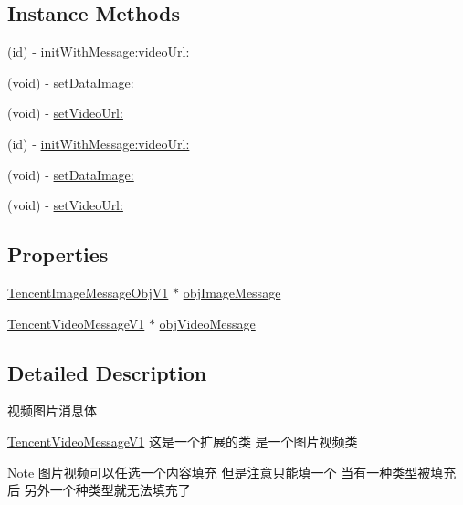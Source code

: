 \subsection*{Instance Methods}
\begin{DoxyCompactItemize}
\item 
(id) -\/ \mbox{\hyperlink{interface_tencent_image_and_video_message_obj_v1_a7726190ba2e9115e6da8926579156b97}{init\+With\+Message\+:video\+Url\+:}}
\item 
(void) -\/ \mbox{\hyperlink{interface_tencent_image_and_video_message_obj_v1_a20ea61f616fbd28176b83cfd0a2dfb78}{set\+Data\+Image\+:}}
\item 
(void) -\/ \mbox{\hyperlink{interface_tencent_image_and_video_message_obj_v1_ae5621c0fa27f66e338e8537d403aeeaa}{set\+Video\+Url\+:}}
\item 
(id) -\/ \mbox{\hyperlink{interface_tencent_image_and_video_message_obj_v1_a7726190ba2e9115e6da8926579156b97}{init\+With\+Message\+:video\+Url\+:}}
\item 
(void) -\/ \mbox{\hyperlink{interface_tencent_image_and_video_message_obj_v1_a20ea61f616fbd28176b83cfd0a2dfb78}{set\+Data\+Image\+:}}
\item 
(void) -\/ \mbox{\hyperlink{interface_tencent_image_and_video_message_obj_v1_ae5621c0fa27f66e338e8537d403aeeaa}{set\+Video\+Url\+:}}
\end{DoxyCompactItemize}
\subsection*{Properties}
\begin{DoxyCompactItemize}
\item 
\mbox{\hyperlink{interface_tencent_image_message_obj_v1}{Tencent\+Image\+Message\+Obj\+V1}} $\ast$ \mbox{\hyperlink{interface_tencent_image_and_video_message_obj_v1_a3fed6a96ac0a27bfbdf810b12e654d3e}{obj\+Image\+Message}}
\item 
\mbox{\hyperlink{interface_tencent_video_message_v1}{Tencent\+Video\+Message\+V1}} $\ast$ \mbox{\hyperlink{interface_tencent_image_and_video_message_obj_v1_a26cdc5a89d5f227771782ee04679afea}{obj\+Video\+Message}}
\end{DoxyCompactItemize}


\subsection{Detailed Description}
视频图片消息体 

\mbox{\hyperlink{interface_tencent_video_message_v1}{Tencent\+Video\+Message\+V1}} 这是一个扩展的类 是一个图片视频类 \begin{DoxyNote}{Note}
图片视频可以任选一个内容填充 但是注意只能填一个 当有一种类型被填充后 另外一个种类型就无法填充了 
\end{DoxyNote}


